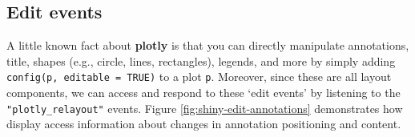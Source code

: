 \documentclass[
  12pt,
]{krantz}
\begin{document}
\hypertarget{edit-events}{%
\subsection{Edit events}\label{edit-events}}


A little known fact about \textbf{plotly} is that you can directly manipulate annotations, title, shapes (e.g., circle, lines, rectangles), legends, and more by simply adding \texttt{config(p,\ editable\ =\ TRUE)} to a plot \texttt{p}. Moreover, since these are all layout components, we can access and respond to these `edit events' by listening to the \texttt{"plotly\_relayout"} events. Figure \ref{fig:shiny-edit-annotations} demonstrates how display access information about changes in annotation positioning and content.
\end{document}
